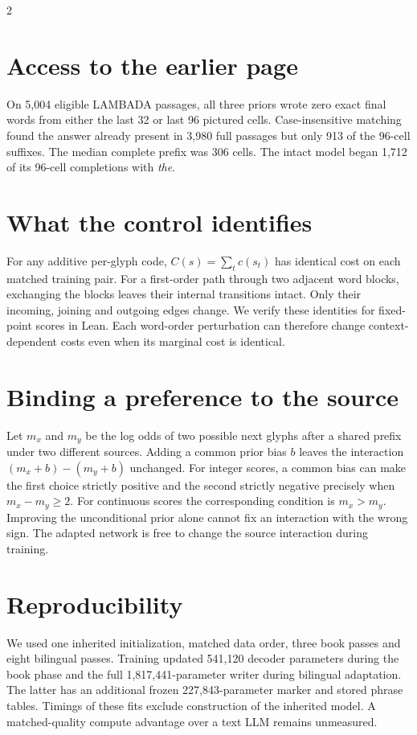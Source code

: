 \documentclass[10pt,a4paper]{article}
\begin{document}
\begin{multicols}{2}
\section*{Access to the earlier page}
On 5,004 eligible LAMBADA passages,\cite{lambada} all three priors wrote zero exact final words from either the last 32 or last 96 pictured cells. Case-insensitive matching found the answer already present in 3,980 full passages but only 913 of the 96-cell suffixes. The median complete prefix was 306 cells. The intact model began 1,712 of its 96-cell completions with \emph{the}.

\section*{What the control identifies}
For any additive per-glyph code, $C(s)=\sum_t c(s_t)$ has identical cost on each matched training pair. For a first-order path through two adjacent word blocks, exchanging the blocks leaves their internal transitions intact. Only their incoming, joining and outgoing edges change. We verify these identities for fixed-point scores in Lean. Each word-order perturbation can therefore change context-dependent costs even when its marginal cost is identical.
\section*{Binding a preference to the source}
Let $m_x$ and $m_y$ be the log odds of two possible next glyphs after a shared prefix under two different sources. Adding a common prior bias $b$ leaves the interaction $(m_x+b)-(m_y+b)$ unchanged. For integer scores, a common bias can make the first choice strictly positive and the second strictly negative precisely when $m_x-m_y\ge 2$. For continuous scores the corresponding condition is $m_x>m_y$. Improving the unconditional prior alone cannot fix an interaction with the wrong sign. The adapted network is free to change the source interaction during training.
\columnbreak

\section*{Reproducibility}
We used one inherited initialization, matched data order, three book passes and eight bilingual passes. Training updated 541,120 decoder parameters during the book phase and the full 1,817,441-parameter writer during bilingual adaptation. The latter has an additional frozen 227,843-parameter marker and stored phrase tables. Timings of these fits exclude construction of the inherited model. A matched-quality compute advantage over a text LLM remains unmeasured.


\end{multicols}
\end{document}
